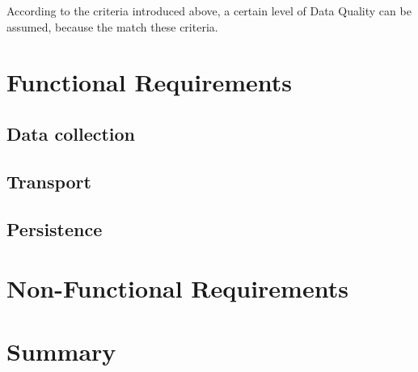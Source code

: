 According to the criteria introduced above, a certain level of Data Quality can be assumed, because the match these criteria.

\section{Functional Requirements}



%
\subsection{Data collection}
%
\subsection{Transport}
%
\subsection{Persistence}
%
\section{Non-Functional Requirements}

\section{Summary}